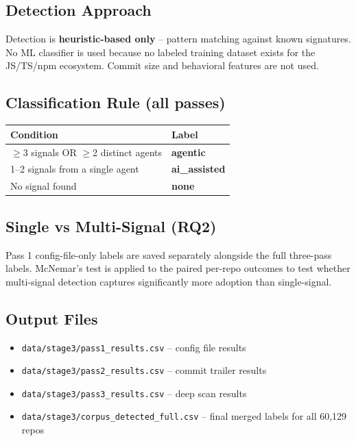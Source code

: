 \documentclass[12pt,a4paper]{article}
\begin{document}
\subsection{Detection Approach}

Detection is \textbf{heuristic-based only} -- pattern matching against known signatures.
No ML classifier is used because no labeled training dataset exists for the JS/TS/npm
ecosystem. Commit size and behavioral features are not used.

\subsection{Classification Rule (all passes)}

\begin{table}[h]
\centering
\begin{tabular}{@{}ll@{}}
\toprule
Condition & Label \\
\midrule
$\geq$3 signals OR $\geq$2 distinct agents & \textbf{agentic} \\
1--2 signals from a single agent           & \textbf{ai\_assisted} \\
No signal found                            & \textbf{none} \\
\bottomrule
\end{tabular}
\end{table}

\subsection{Single vs Multi-Signal (RQ2)}

Pass 1 config-file-only labels are saved separately alongside the full three-pass labels.
McNemar's test is applied to the paired per-repo outcomes to test whether multi-signal
detection captures significantly more adoption than single-signal.

\subsection{Output Files}
\begin{itemize}
  \item \texttt{data/stage3/pass1\_results.csv} -- config file results
  \item \texttt{data/stage3/pass2\_results.csv} -- commit trailer results
  \item \texttt{data/stage3/pass3\_results.csv} -- deep scan results
  \item \texttt{data/stage3/corpus\_detected\_full.csv} -- final merged labels for all 60,129 repos
\end{itemize}
\end{document}
